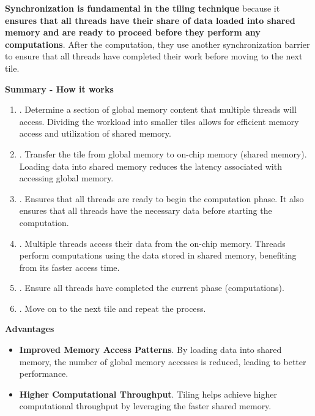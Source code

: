 \highspace
\textbf{Synchronization is fundamental in the tiling technique} because it \textbf{ensures that all threads have their share of data loaded into shared memory and are ready to proceed before they perform any computations}. After the computation, they use another synchronization barrier to ensure that all threads have completed their work before moving to the next tile.

\newpage

\begin{flushleft}
    \textcolor{Green3}{ \textbf{Summary - How it works}}
\end{flushleft}
\begin{enumerate}
    \item {}. Determine a section of global memory content that multiple threads will access. Dividing the workload into smaller tiles allows for efficient memory access and utilization of shared memory.
    \item {}. Transfer the tile from global memory to on-chip memory (shared memory). Loading data into shared memory reduces the latency associated with accessing global memory.
    \item {}. Ensures that all threads are ready to begin the computation phase. It also ensures that all threads have the necessary data before starting the computation.
    \item {}. Multiple threads access their data from the on-chip memory. Threads perform computations using the data stored in shared memory, benefiting from its faster access time.
    \item {}. Ensure all threads have completed the current phase (computations).
    \item {}. Move on to the next tile and repeat the process.
\end{enumerate}

\highspace
\begin{flushleft}
    \textcolor{Green3}{ \textbf{Advantages}}
\end{flushleft}
\begin{itemize}
    \item[\textcolor{Green3}{\faIcon{check}}] \textbf{Improved Memory Access Patterns}. By loading data into shared memory, the number of global memory accesses is reduced, leading to better performance.
    \item[\textcolor{Green3}{\faIcon{check}}] \textbf{Higher Computational Throughput}. Tiling helps achieve higher computational throughput by leveraging the faster shared memory.
\end{itemize}
